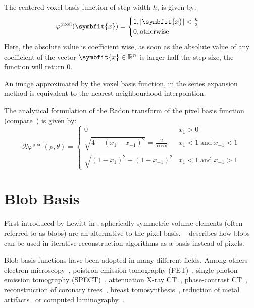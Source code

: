 The centered voxel basis function of step width \(h\), is given by:
\begin{equation}\label{eq:voxel_basis_fn}
	\varphi^{\text{pixel}}(\symbfit{x}) =
	\begin{cases}
		1, \abs{\symbfit{x}} < \frac{h}{2} \\
		0, \text{otherwise}
	\end{cases}
\end{equation}
Here, the absolute value is coefficient wise, as soon as the absolute value of any coefficient of
the vector \(\symbfit{x} \in \mathbb{R}^n\) is larger half the step size, the function will return
\(0\).

An image approximated by the voxel basis function, in the series expansion method is equivalent to
the nearest neighbourhood interpolation.

The analytical formulation of the Radon transform of the pixel basis function
(compare~) is given by:
\begin{equation}\label{eq:radon_voxel_basis}
	\mathscr{R}\varphi^{\text{pixel}}(\rho, \theta) =
	\begin{cases}
		0                                                  & x_1 > 0                         \\
		\sqrt{4 + (x_1 - x_{-1})^2} = \frac{2}{\cos\theta} & x_1 < 1\;\text{and}\;x_{-1} < 1 \\
		\sqrt{(1 - x_1)^2 + (1 - x_{-1})^2}                & x_1 < 1\;\text{and}\;x_{-1} > 1
	\end{cases}
\end{equation}


\section{Blob Basis}\label{sec:blob_basis}

First introduced by Lewitt in , spherically symmetric
volume elements (often referred to as blobs) are an alternative to the pixel basis.
~\cite{lewitt_alternatives_1992} describes how blobs can be used in iterative reconstruction
algorithms as a basis instead of pixels.

Blob basis functions have been adopted in many different fields. Among others electron
microscopy~\cite{marabini_3d_1998, garduno_optimization_2001}, poistron emission tomography
(PET)~\cite{jacobs_comparative_1999, chlewicki_noise_2004}, single-photon emission tomography
(SPECT)~\cite{wang_3d_2004, yendiki_comparison_2004}, attenuation X-ray
CT~\cite{jacobs_iterative_1999, carvalho_helical_2003, isola_motion-compensated_2008},
phase-contrast CT~\cite{kohler_iterative_2011, xu_investigation_2012}, reconstruction of coronary
trees~\cite{zhou_blob-based_2008}, breast tomosynthesis~\cite{wu_breast_2010}, reduction of metal
artifacts~\cite{levakhina_two-step_2010} or computed laminography~\cite{trampert_spherically_2017}.

